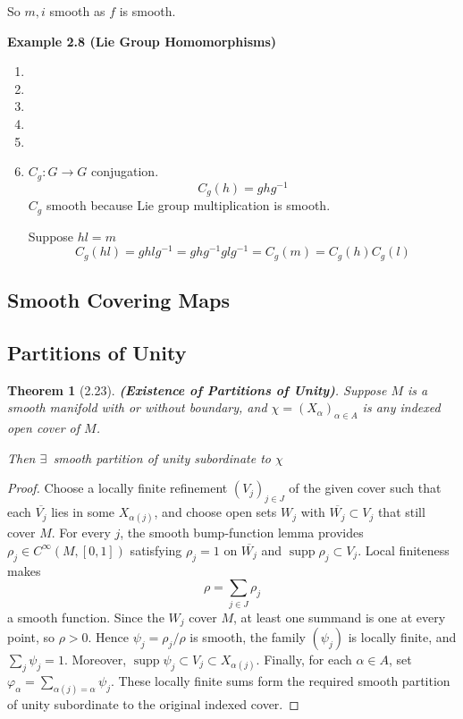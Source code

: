 \documentclass[11pt]{amsart}
\newtheorem{theorem}{Theorem}
\theoremstyle{definition}
\begin{document}
So $m,i$ smooth as $f$ is smooth.

\textbf{Example 2.8 (Lie Group Homomorphisms)}

\begin{enumerate}
\item[(a)]
\item[(b)]
\item[(c)]
\item[(d)]
\item[(e)]
\item[(f)] $C_g: G\to G$ conjugation.
\[
C_g(h) = ghg^{-1}
\]
$C_g$ smooth because Lie group multiplication is smooth.

Suppose $hl = m$
\[
C_g(hl) = ghlg^{-1} = ghg^{-1}g l g^{-1} = C_g(m) = C_g(h) C_g(l)
\]
\end{enumerate}

\subsection*{ Smooth Covering Maps }

\subsection*{ Partitions of Unity }

\begin{theorem}[2.23] \textbf{(Existence of Partitions of Unity)}.  Suppose $M$ is a smooth manifold with or without boundary, and $\chi = (X_{\alpha})_{\alpha \in A}$ is any indexed open cover of $M$.

Then $\exists \,$ smooth partition of unity subordinate to $\chi$
\end{theorem}

\begin{proof}
Choose a locally finite refinement $(V_j)_{j\in J}$ of the given cover
such that each $\overline{V_j}$ lies in some $X_{\alpha(j)}$, and choose
open sets $W_j$ with $\overline{W_j}\subset V_j$ that still cover $M$.
For every $j$, the smooth bump-function lemma provides
$\rho_j\in C^\infty(M,[0,1])$ satisfying $\rho_j=1$ on
$\overline{W_j}$ and $\operatorname{supp}\rho_j\subset V_j$.
Local finiteness makes
\[
  \rho=\sum_{j\in J}\rho_j
\]
a smooth function.  Since the $W_j$ cover $M$, at least one summand is
one at every point, so $\rho>0$.  Hence $\psi_j=\rho_j/\rho$ is smooth,
the family $(\psi_j)$ is locally finite, and
$\sum_j\psi_j=1$.  Moreover,
$\operatorname{supp}\psi_j\subset V_j\subset X_{\alpha(j)}$.
Finally, for each $\alpha\in A$, set
$\varphi_\alpha=\sum_{\alpha(j)=\alpha}\psi_j$.  These locally finite
sums form the required smooth partition of unity subordinate to the
original indexed cover.
\end{proof}
\end{document}

